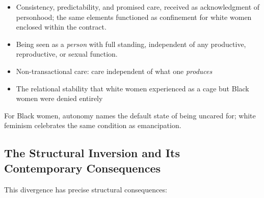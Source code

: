 \begin{itemize}
    \item Consistency, predictability, and promised care, received as acknowledgment of personhood; the same elements functioned as confinement for white women enclosed within the contract.
    \item Being seen as a \textit{person} with full standing, independent of any productive, reproductive, or sexual function.
    \item Non-transactional care: care independent of what one \textit{produces}
    \item The relational stability that white women experienced as a cage but Black women were denied entirely
\end{itemize}

For Black women, autonomy names the default state of being uncared for; white feminism celebrates the same condition as emancipation.

\subsection{The Structural Inversion and Its Contemporary Consequences}

This divergence has precise structural consequences:

